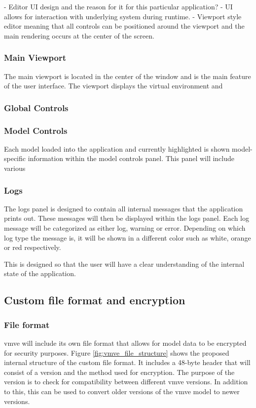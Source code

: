 \documentclass[11pt]{article}
\begin{document}
- Editor UI design and the reason for it for this particular application?
-   UI allows for interaction with underlying system during runtime.
-   Viewport style editor meaning that all controls can be positioned
    around the viewport and the main rendering occurs at the center of
    the screen.

\subsubsection{Main Viewport}
The main viewport is located in the center of the window and is the main feature
of the user interface. The viewport displays the virtual environment and 

\subsubsection{Global Controls}

\subsubsection{Model Controls}

Each model loaded into the application and currently highlighted is shown
model-specific information within the model controls panel. This panel will include various 


\subsubsection{Logs}
The logs panel is designed to contain all internal messages that the application
prints out. These messages will then be displayed within the logs panel. Each
log message will be categorized as either log, warning or error. Depending on
which log type the message is, it will be shown in a different color such as
white, orange or red respectively.

This is designed so that the user will have a clear understanding of the internal state
of the application.

\subsection{Custom file format and encryption}

\subsubsection{File format}
\gls*{vmve} will include its own file format that allows for model data to be
encrypted for security purposes. Figure \ref{fig:vmve_file_structure} shows the
proposed internal structure of the custom file format. It includes a 48-byte
header that will consist of a version and the method used for encryption. The
purpose of the version is to check for compatibility between different
\gls*{vmve} versions. In addition to this, this can be used to convert older
versions of the \gls*{vmve} model to newer versions.
\end{document}
